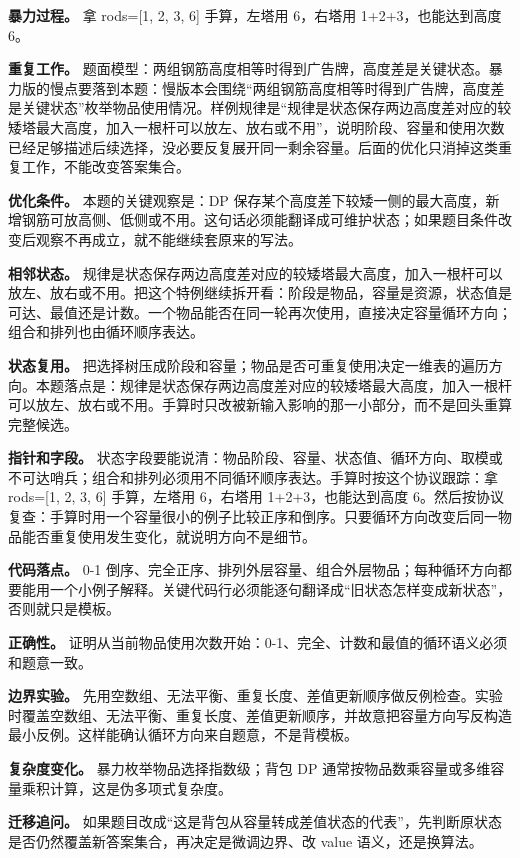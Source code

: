 \textbf{暴力过程。} 拿 rods=[1, 2, 3, 6] 手算，左塔用 6，右塔用 1+2+3，也能达到高度 6。

\textbf{重复工作。} 题面模型：两组钢筋高度相等时得到广告牌，高度差是关键状态。暴力版的慢点要落到本题：慢版本会围绕“两组钢筋高度相等时得到广告牌，高度差是关键状态”枚举物品使用情况。样例规律是“规律是状态保存两边高度差对应的较矮塔最大高度，加入一根杆可以放左、放右或不用”，说明阶段、容量和使用次数已经足够描述后续选择，没必要反复展开同一剩余容量。后面的优化只消掉这类重复工作，不能改变答案集合。

\textbf{优化条件。} 本题的关键观察是：DP 保存某个高度差下较矮一侧的最大高度，新增钢筋可放高侧、低侧或不用。这句话必须能翻译成可维护状态；如果题目条件改变后观察不再成立，就不能继续套原来的写法。

\textbf{相邻状态。} 规律是状态保存两边高度差对应的较矮塔最大高度，加入一根杆可以放左、放右或不用。把这个特例继续拆开看：阶段是物品，容量是资源，状态值是可达、最值还是计数。一个物品能否在同一轮再次使用，直接决定容量循环方向；组合和排列也由循环顺序表达。

\textbf{状态复用。} 把选择树压成阶段和容量；物品是否可重复使用决定一维表的遍历方向。本题落点是：规律是状态保存两边高度差对应的较矮塔最大高度，加入一根杆可以放左、放右或不用。手算时只改被新输入影响的那一小部分，而不是回头重算完整候选。

\textbf{指针和字段。} 状态字段要能说清：物品阶段、容量、状态值、循环方向、取模或不可达哨兵；组合和排列必须用不同循环顺序表达。手算时按这个协议跟踪：拿 rods=[1, 2, 3, 6] 手算，左塔用 6，右塔用 1+2+3，也能达到高度 6。然后按协议复查：手算时用一个容量很小的例子比较正序和倒序。只要循环方向改变后同一物品能否重复使用发生变化，就说明方向不是细节。

\textbf{代码落点。} 0-1 倒序、完全正序、排列外层容量、组合外层物品；每种循环方向都要能用一个小例子解释。关键代码行必须能逐句翻译成“旧状态怎样变成新状态”，否则就只是模板。

\textbf{正确性。} 证明从当前物品使用次数开始：0-1、完全、计数和最值的循环语义必须和题意一致。

\textbf{边界实验。} 先用空数组、无法平衡、重复长度、差值更新顺序做反例检查。实验时覆盖空数组、无法平衡、重复长度、差值更新顺序，并故意把容量方向写反构造最小反例。这样能确认循环方向来自题意，不是背模板。

\textbf{复杂度变化。} 暴力枚举物品选择指数级；背包 DP 通常按物品数乘容量或多维容量乘积计算，这是伪多项式复杂度。

\textbf{迁移追问。} 如果题目改成“这是背包从容量转成差值状态的代表”，先判断原状态是否仍然覆盖新答案集合，再决定是微调边界、改 value 语义，还是换算法。

